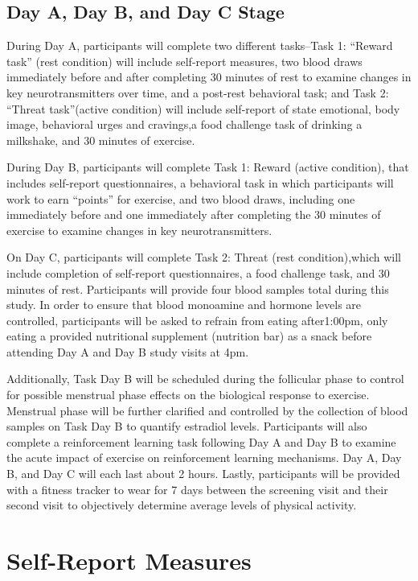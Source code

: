 \documentclass[
]{book}
\begin{document}
\section{Day A, Day B, and Day C Stage}\label{day-a-day-b-and-day-c-stage}

During Day A, participants will complete two different tasks--Task 1: ``Reward task'' (rest condition) will include self-report measures, two blood draws immediately before and after completing 30 minutes of rest to examine changes in key neurotransmitters over time, and a post-rest behavioral task; and Task 2: ``Threat task''(active condition) will include self-report of state emotional, body image, behavioral urges and cravings,a food challenge task of drinking a milkshake, and 30 minutes of exercise.

During Day B, participants will complete Task 1: Reward (active condition), that includes self-report questionnaires, a behavioral task in which participants will work to earn ``points'' for exercise, and two blood draws, including one immediately before and one immediately after completing the 30 minutes of exercise to examine changes in key neurotransmitters.

On Day C, participants will complete Task 2: Threat (rest condition),which will include completion of self-report questionnaires, a food challenge task, and 30 minutes of rest. Participants will provide four blood samples total during this study. In order to ensure that blood monoamine and hormone levels are controlled, participants will be asked to refrain from eating after1:00pm, only eating a provided nutritional supplement (nutrition bar) as a snack before attending Day A and Day B study visits at 4pm.

Additionally, Task Day B will be scheduled during the follicular phase to control for possible menstrual phase effects on the biological response to exercise. Menstrual phase will be further clarified and controlled by the collection of blood samples on Task Day B to quantify estradiol levels. Participants will also complete a reinforcement learning task following Day A and Day B to examine the acute impact of exercise on reinforcement learning mechanisms. Day A, Day B, and Day C will each last about 2 hours. Lastly, participants will be provided with a fitness tracker to wear for 7 days between the screening visit and their second visit to objectively determine average levels of physical activity.

\chapter{Self-Report Measures}\label{self-report-measures}
\end{document}
